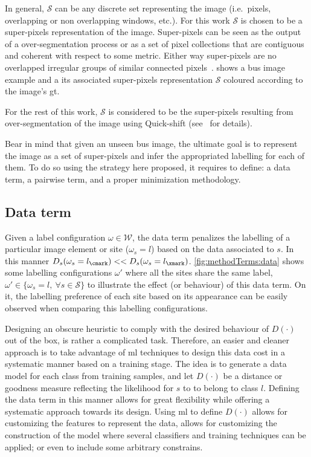 In general, $\mathcal{S}$ can be any discrete set representing the image (i.e.\, pixels, overlapping or non overlapping windows, etc.). 
For this work $\mathcal{S}$ is chosen to be a super-pixels representation of the image.
Super-pixels can be seen as the output of a over-segmentation process or as a set of pixel collections that are contiguous and coherent with respect to some metric. Either way super-pixels are no overlapped irregular groups of similar connected pixels~\cite{achanta2012slic}.
 shows a \ac{bus} image example and a its associated super-pixels representation $\mathcal{S}$ coloured according to the image's \ac{gt}.

For the rest of this work, $\mathcal{S}$ is considered to be the super-pixels resulting from over-segmentation of the image using Quick-shift (see~\cite{massich2013phd} for details). 

Bear in mind that given an unseen \ac{bus} image, the ultimate goal is to represent the image as a set of super-pixels and infer the appropriated labelling for each of them.
To do so using the strategy here proposed, it requires to define: a data term, a pairwise term, and a proper minimization methodology.

\subsection{Data term} \label{sec:method:dataTerm}

Given a label configuration $\omega \in \mathcal{W}$, the data term penalizes the 
labelling of a particular image element or site ($\omega_s = l$) based on the data associated to $s$. 
In this manner $D_s(\omega_s=l_\cmark) << D_s(\omega_s=l_\xmark)$. 
\cref{fig:methodTerms:data} shows some labelling configurations $\omega'$ where all the sites share the same label, $\omega' \in \{ \omega_s=l,~\forall s\in\mathcal{S}\}$ to illustrate the effect (or behaviour) of this data term.
On it, the labelling preference of each site based on its appearance can be easily observed when comparing this labelling configurations.

Designing an obscure heuristic to comply with the desired behaviour of $D(\cdot)$ out of the box, is rather a complicated task.
Therefore, an easier and cleaner approach is to take advantage of \ac{ml} techniques to design this data cost in a systematic manner based on a training stage. 
The idea is to generate a data model for each class from training samples, and let $D(\cdot)$ be a distance or goodness measure reflecting the likelihood for $s$ to to belong to class $l$.
Defining the data term in this manner allows for great flexibility while offering a systematic approach towards its design.  
Using \ac{ml} to define $D(\cdot)$ allows for customizing the features to represent the data, allows for customizing the construction of the model where several classifiers and training techniques can be applied; or even to include some arbitrary constrains.

